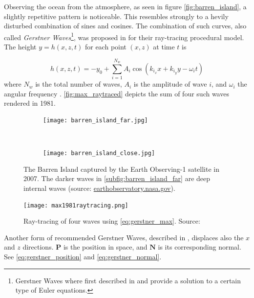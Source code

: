 Observing the ocean from the atmosphere, as seen in figure
\autoref{fig:barren_island}, a slightly repetitive pattern is noticeable. This
resembles strongly to a hevily disturbed combination of sines and cosines. The
combination of such curves, also called \textit{Gerstner
Waves}\footnote{Gerstner Waves where first described in
\autocite{gerstner1802theorie} and provide a solution to a certain type of
Euler equations.}, was proposed in \autocite{max1981vectorized} for their
ray-tracing procedural model. The height $y = h(x,z,t)$ for each point $(x,z)$
at time $t$ is

\begin{equation}\label{eq:gerstner_max}
    h(x, z, t) = -y_0 + \sum_{i = 1}^{N_w} A_i \cos(k_{i_x}x + k_{i_y}y -
    \omega_i t)
\end{equation}
%
where $N_w$ is the total number of waves, $A_i$ is the amplitude of wave $i$,
and $\omega_i$ the angular frequency
\autocite{max1981vectorized,darles2011survey}. \autoref{fig:max_raytraced}
depicts the sum of four such waves rendered in 1981.

\begin{figure}[ht!]
    \centering
    \begin{subfigure}[ht]{\textwidth}
        \centering
        \texttt{[image: barren\_island\_far.jpg]}
        \label{subfig:barren_island_far}
    \end{subfigure}\\%
    \begin{subfigure}[ht]{\textwidth}
        \centering
        \texttt{[image: barren\_island\_close.jpg]}
        \label{subfig:barren_island_close}
    \end{subfigure}
    \caption{The Barren Island captured by the Earth Observing-1 satellite in
        2007. The darker waves in \autoref{subfig:barren_island_far} are
        deep internal waves (source:
        \url{earthobservatory.nasa.gov}).}\label{fig:barren_island}
\end{figure}

\begin{figure}[ht]
    \centering
    \texttt{[image: max1981raytracing.png]}
    \caption{Ray-tracing of four waves using \autoref{eq:gerstner_max}. Source:
    \autocite{max1981vectorized}}\label{fig:max_raytraced}
\end{figure}

Another form of recommended Gerstner Waves, described in
\autocite[Chapter~1]{fernando2004gpu}, displaces also the $x$ and $z$
directions. $\textbf{P}$ is the position in space, and $\textbf{N}$ is its
corresponding normal. See \autoref{eq:gerstner_position} and
\autoref{eq:gerstner_normal}.

